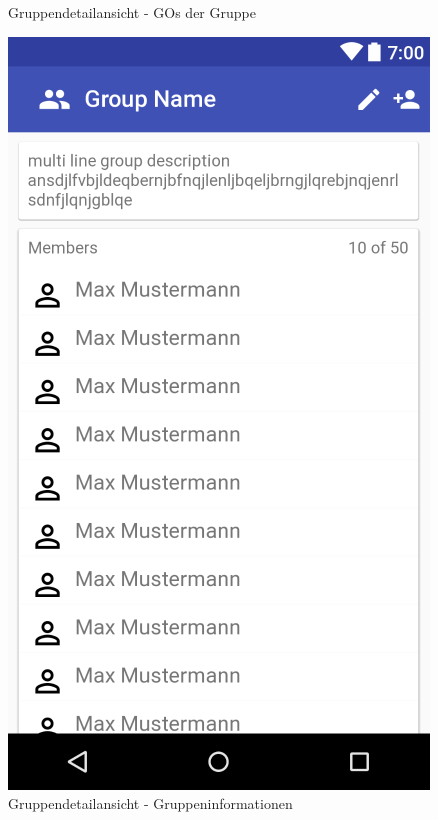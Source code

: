 \documentclass[parskip=full]{scrartcl}
\begin{document}
\begin{figure}[H]
\begin{minipage}[b]{0.4\textwidth}
	\caption{Gruppendetailansicht - GOs der Gruppe}\label{gruppendetailansicht}
  \end{minipage}
  \hfill
  \begin{minipage}[b]{0.4\textwidth}
    \includegraphics[width=\textwidth]{GUI/AndroidStudio/group_info.PNG}
	\caption{Gruppendetailansicht - Gruppeninformationen}\label{gruppeninfo}
  \end{minipage}
  \vspace{1cm}
\end{figure}
\end{document}
